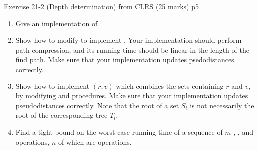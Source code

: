 \documentclass[a4paper, 11pt]{article}
\begin{document}
\begin{problem}{%
	Exercise 21-2 (Depth determination) from CLRS	\hfill  (25 marks)
}{p5%
}
\begin{enumerate}[resume, label=\bfseries\itshape\alph*.]
	\item Give an implementation of 
	\item Show how to modify  to implement . Your implementation should perform path compression, and its running time should be linear in the length of the find path. Make sure that your implementation updates psedodistances correctly.
	\item Show how to implement $(r,v)$ which combines the sets containing $r$ and $v$, by modifying  and  procedures. Make sure that your implementation updates pseudodistances correctly. Note that the root of a set $S_i$ is not necessarily the root of the corresponding tree $T_i$.
	\item Find a tight bound on the worst-case running time of a sequence of $m$ ,  , and  operations, $n$ of which are  operations.
\end{enumerate}
\end{problem}
\end{document}
